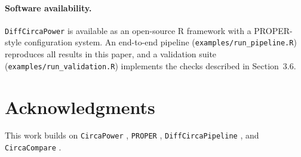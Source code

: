 \documentclass{article}
\newcommand{\software}[1]{\texttt{#1}}
\begin{document}
\paragraph{Software availability.} \software{DiffCircaPower} is available as an open-source R framework with a PROPER-style configuration system. An end-to-end pipeline (\texttt{examples/run\_pipeline.R}) reproduces all results in this paper, and a validation suite (\texttt{examples/run\_validation.R}) implements the checks described in Section~3.6.

\section*{Acknowledgments}

This work builds on \software{CircaPower} \cite{zong2023circapower}, \software{PROPER} \cite{wu2015proper}, \software{DiffCircaPipeline} \cite{xue2023diffcircapipeline}, and \software{CircaCompare} \cite{parsons2020circacompare}.



\end{document}
